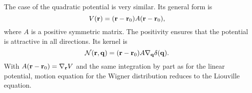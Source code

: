 The case of the quadratic potential is very similar.
Its general form is
\begin{equation}
	V(\mathbf{ r }) = (\mathbf{ r }-\mathbf{ r }_0) A (\mathbf{ r }-\mathbf{ r }_0) ,
	\nonumber
\end{equation}
where $A$ is a positive symmetric matrix. The positivity ensures that the potential is attractive in all directions.
Its kernel is
\begin{equation}
	\label{eq:quadraticKernel}
	\mathcal{N}(\mathbf{ r },\mathbf{ q }) =
	(\mathbf{ r }-\mathbf{ r }_0) A \nabla_{\mathbf{ q }} \delta(\mathbf{ q }) .
\end{equation}
With $A (\mathbf{ r }-\mathbf{ r }_0) = \nabla_{\mathbf{ r }}V$ and the same integration by part as for the linear potential, motion equation for the Wigner distribution reduces to the Liouville equation.


